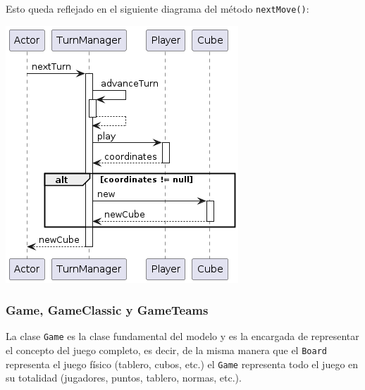 \documentclass[../DocumentoOficial.tex]{subfiles}
\begin{document}
Esto queda reflejado en el siguiente diagrama del método \texttt{nextMove()}:

\begin{center}
\includegraphics[scale=0.75]{TurnManager.nextTurn()-sprint7.png} 
\end{center}

\newpage
\subsubsection{Game, GameClassic y GameTeams}
La clase \texttt{Game} es la clase fundamental del modelo y es la encargada de representar el concepto del juego completo, es decir, de la misma manera que el \texttt{Board} representa el juego físico (tablero, cubos, etc.) el \texttt{Game} representa todo el juego en su totalidad (jugadores, puntos, tablero, normas, etc.).
\end{document}
